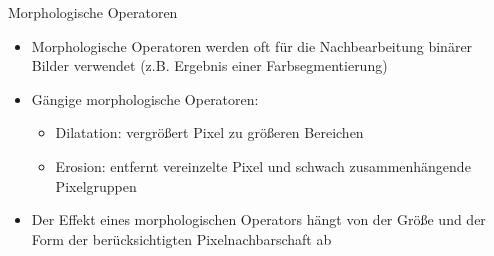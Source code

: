 \documentclass[paper=a4, fontsize=11pt]{scrartcl} %
\numberwithin{equation}{section} %
\numberwithin{figure}{section} %
\numberwithin{table}{section} %
\begin{document}
Morphologische Operatoren
\begin{itemize}
\item Morphologische Operatoren werden oft für die Nachbearbeitung binärer Bilder verwendet (z.B. Ergebnis einer Farbsegmentierung)
\item Gängige morphologische Operatoren:
\begin{itemize}
\item Dilatation: vergrößert Pixel zu größeren Bereichen
\item Erosion: entfernt vereinzelte Pixel und schwach zusammenhängende Pixelgruppen
\end{itemize}
\item Der Effekt eines morphologischen Operators hängt von der Größe und der Form der berücksichtigten Pixelnachbarschaft ab
\end{itemize}
\end{document}

